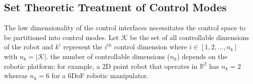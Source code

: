 \documentclass[conference]{IEEEtran}
\begin{document}
\subsection{Set Theoretic Treatment of Control Modes}\label{ssec:set_modes}
%
The low dimensionality of the control interfaces necessitates the control space to be partitioned into control modes.
Let $\mathcal{K}$ be the set of all controllable dimensions of the robot and $k^i$ represent the $i^{th}$ control dimension where $i \in [1,2,\dots,n_k]$ with $n_k = \vert\mathcal{K}\vert$. the number of controllable dimensions ($n_k$) depends on the robotic platform; for example, a 2D point robot that operates in $\mathbb{R}^2$ has $n_k = 2$ whereas $n_k =6$ for a 6DoF robotic manipulator. 
\end{document}
